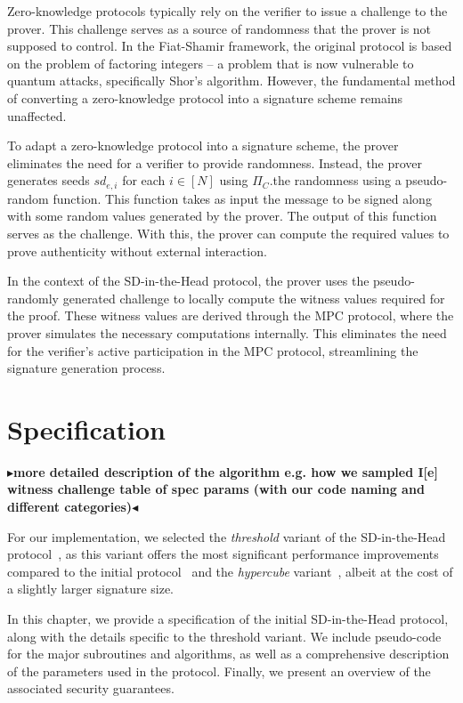 \documentclass[twoside,11pt]{report}
\theoremstyle{definition}
\theoremstyle{plain}
\newcommand{\todo}[1]{{\color[rgb]{.5,0,0}\textbf{$\blacktriangleright$#1$\blacktriangleleft$}}}
\begin{document}
Zero-knowledge protocols typically rely on the verifier to issue a challenge to the prover. This challenge serves as a source of randomness that the prover is not supposed to control. In the Fiat-Shamir framework, the original protocol is based on the problem of factoring integers -- a problem that is now vulnerable to quantum attacks, specifically Shor's algorithm. However, the fundamental method of converting a zero-knowledge protocol into a signature scheme remains unaffected.

To adapt a zero-knowledge protocol into a signature scheme, the prover eliminates the need for a verifier to provide randomness. Instead, the prover generates seeds $sd_{e,i}$ for each $i \in [N]$ using $\Pi_C$.the randomness using a pseudo-random function. This function takes as input the message to be signed along with some random values generated by the prover. The output of this function serves as the challenge. With this, the prover can compute the required values to prove authenticity without external interaction.

In the context of the SD-in-the-Head protocol, the prover uses the pseudo-randomly generated challenge to locally compute the witness values required for the proof. These witness values are derived through the MPC protocol, where the prover simulates the necessary computations internally. This eliminates the need for the verifier's active participation in the MPC protocol, streamlining the signature generation process.


\chapter{Specification}\label{ch:spec}

\todo{more detailed description of the algorithm
  e.g. how we sampled I[e] witness challenge
  table of spec params (with our code naming and different categories)}

For our implementation, we selected the \textit{threshold} variant of the SD-in-the-Head protocol~\cite{aguilarsyndrome11,feneuil2023threshold}, as this variant offers the most significant performance improvements compared to the initial protocol~\cite{feneuil2022syndrome} and the \textit{hypercube} variant~\cite{aguilarsyndrome11,aguilar2023return}, albeit at the cost of a slightly larger signature size.

In this chapter, we provide a specification of the initial SD-in-the-Head protocol, along with the details specific to the threshold variant. We include pseudo-code for the major subroutines and algorithms, as well as a comprehensive description of the parameters used in the protocol. Finally, we present an overview of the associated security guarantees.
\end{document}
